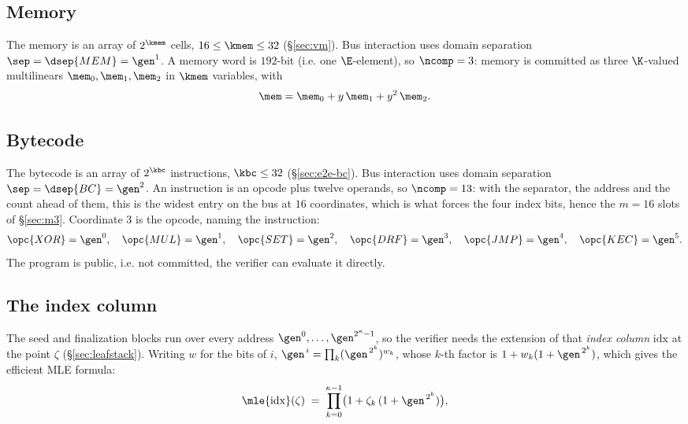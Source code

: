 \subsection{Memory}\label{sec:memchan}

The memory is an array of $2^{\kmem}$ cells, $16\le\kmem\le32$ (\S\ref{sec:vm}). Bus interaction uses domain separation $\sep=\dsep{MEM} = \gen^{1}$. A memory word is $192$-bit (i.e. one $\E$-element), so $\ncomp=3$: memory is committed as three $\K$-valued multilinears $\mem_0,\mem_1,\mem_2$ in $\kmem$ variables, with
\[
  \mem=\mem_0+y\,\mem_1+y^2\,\mem_2 .
\]

\subsection{Bytecode}\label{sec:bytecode}

The bytecode is an array of $2^{\kbc}$ instructions, $\kbc \le 32$ (\S\ref{sec:e2e-bc}). Bus interaction uses domain separation $\sep=\dsep{BC} = \gen^{2}$. An instruction is an opcode plus twelve operands, so $\ncomp=13$: with the separator, the address and the count ahead of them, this is the widest entry on the bus at $16$ coordinates, which is what forces the four index bits, hence the $m=16$ slots of \S\ref{sec:m3}. Coordinate $3$ is the opcode, naming the instruction:
\[
  \opc{XOR}=\gen^{0},\quad \opc{MUL}=\gen^{1},\quad \opc{SET}=\gen^{2},\quad \opc{DRF}=\gen^{3},\quad \opc{JMP}=\gen^{4},\quad \opc{KEC}=\gen^{5}.
\] The program is public, i.e. not committed, the verifier can evaluate it directly.

\subsection{The index column}\label{sec:idxcol}

The seed and finalization blocks run over every address $\gen^{0},\dots,\gen^{2^{\kappa}-1}$, so the verifier needs the extension of that \emph{index column} $\mathrm{idx}$ at the point $\zeta$ (\S\ref{sec:leafstack}). Writing $w$ for the bits of $i$, $\gen^{\,i}=\prod_k(\gen^{\,2^{k}})^{w_k}$, whose $k$-th factor is $1+w_k(1+\gen^{\,2^{k}})$, which gives the efficient MLE formula:
\[
  \mle{\mathrm{idx}}(\zeta)\;=\;\prod_{k=0}^{\kappa-1}\bigl(1+\zeta_k\,(1+\gen^{\,2^{k}})\bigr),
\]
